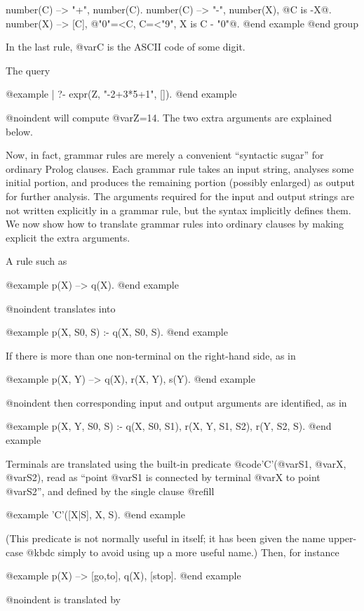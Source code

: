 number(C) --> "+", number(C).
number(C) --> "-", number(X), @{C is -X@}.
number(X) --> [C], @{"0"=<C, C=<"9", X is C - "0"@}.
@end example
@end group

In the last rule, @var{C} is the ASCII code of some digit.

The query

@example
| ?- expr(Z, "-2+3*5+1", []).
@end example

@noindent
will compute @var{Z}=14.  The two extra arguments are explained below.

Now, in fact, grammar rules are merely a convenient ``syntactic sugar'' for
ordinary Prolog clauses.  Each grammar rule takes an input string, analyses
some initial portion, and produces the remaining portion (possibly
enlarged) as output for further analysis.  The arguments required for the
input and output strings are not written explicitly in a grammar rule, but
the syntax implicitly defines them.  We now show how to translate grammar
rules into ordinary clauses by making explicit the extra arguments.

A rule such as

@example
p(X) --> q(X).
@end example

@noindent
translates into

@example
p(X, S0, S) :- q(X, S0, S).
@end example

If there is more than one non-terminal on the right-hand side, as in

@example
p(X, Y) --> 
        q(X), 
        r(X, Y),
        s(Y).
@end example

@noindent
then corresponding input and output arguments are identified, as in

@example
p(X, Y, S0, S) :- 
        q(X, S0, S1), 
        r(X, Y, S1, S2), 
        r(Y, S2, S).
@end example

Terminals are translated using the built-in predicate
@code{'C'(@var{S1}, @var{X}, @var{S2})}, read as ``point @var{S1} is
connected by terminal @var{X} to point @var{S2}'', and defined by the single
clause @refill

@example
'C'([X|S], X, S).
@end example

(This predicate is not normally useful in itself; it has been given the
name upper-case @kbd{c} simply to avoid using up a more useful name.)
Then, for instance

@example
p(X) --> [go,to], q(X), [stop].
@end example

@noindent
is translated by

